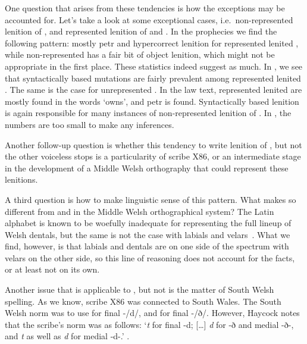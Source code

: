One question that arises from these tendencies is how the exceptions may be accounted for. Let's take a look at some exceptional cases, i.e.\ non-represented lenition of , and represented lenition of  and .
In the prophecies we find the following pattern: mostly \gls{petr} and hypercorrect lenition for represented lenited , while non-represented  has a fair bit of object lenition, which might not be appropriate in the first place.
These statistics indeed suggest as much. In , we see that syntactically based mutations are fairly prevalent among represented lenited .  The same is the case for unrepresented . In the law text, represented lenited  are mostly found in the words  `owns', and \gls{petr} is found. Syntactically based lenition is again responsible for many instances of non-represented lenition of . In , the numbers are too small to make any inferences.

Another follow-up question is whether this tendency to write lenition of , but not the other voiceless stops is a particularity of scribe X86, or an intermediate stage in the development of a Middle Welsh orthography that could represent these lenitions. 

A third question is how to make linguistic sense of this pattern. What makes  so different from  and  in the Middle Welsh orthographical system? The Latin alphabet is known to be woefully inadequate for representing the full lineup of Welsh dentals, but the same is not the case with labials and velars~\autocite{russell_rowynniauc_2003}. What we find, however, is that labials and dentals are on one side of the spectrum with velars on the other side, so this line of reasoning does not account for the facts, or at least not on its own.  

Another issue that is applicable to , but not  is the matter of South Welsh spelling. As we know, scribe X86 was connected to South Wales. The South Welsh norm was to use  for final -/d/, and  for final -/ð/. However, Haycock notes that the scribe's norm was as follows: `\textit{t} for final -d; […] \textit{d} for -ð and medial -ð-, and \textit{t} as well as \textit{d} for medial -d-.' \autocite[p.~7, n.~18]{haycock_legendary_2015}. 




